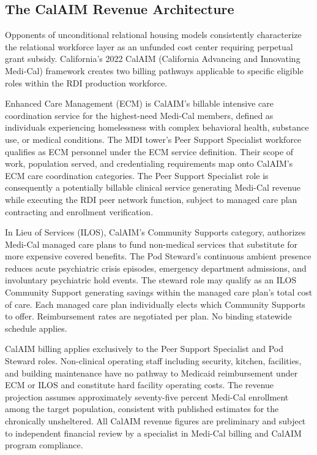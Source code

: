 \documentclass[12pt, letterpaper]{article}
\begin{document}
\subsection{The CalAIM Revenue Architecture}

Opponents of unconditional relational housing models consistently characterize the relational workforce layer as an unfunded cost center requiring perpetual grant subsidy. California's 2022 CalAIM (California Advancing and Innovating Medi-Cal) framework \citep{calaim_2022} creates two billing pathways applicable to specific eligible roles within the RDI production workforce.

Enhanced Care Management (ECM) is CalAIM's billable intensive care coordination service for the highest-need Medi-Cal members, defined as individuals experiencing homelessness with complex behavioral health, substance use, or medical conditions. The MDI tower's Peer Support Specialist workforce qualifies as ECM personnel under the ECM service definition. Their scope of work, population served, and credentialing requirements map onto CalAIM's ECM care coordination categories. The Peer Support Specialist role is consequently a potentially billable clinical service generating Medi-Cal revenue while executing the RDI peer network function, subject to managed care plan contracting and enrollment verification.

In Lieu of Services (ILOS), CalAIM's Community Supports category, authorizes Medi-Cal managed care plans to fund non-medical services that substitute for more expensive covered benefits. The Pod Steward's continuous ambient presence reduces acute psychiatric crisis episodes, emergency department admissions, and involuntary psychiatric hold events. The steward role may qualify as an ILOS Community Support generating savings within the managed care plan's total cost of care. Each managed care plan individually elects which Community Supports to offer. Reimbursement rates are negotiated per plan. No binding statewide schedule applies.

CalAIM billing applies exclusively to the Peer Support Specialist and Pod Steward roles. Non-clinical operating staff including security, kitchen, facilities, and building maintenance have no pathway to Medicaid reimbursement under ECM or ILOS and constitute hard facility operating costs. The revenue projection assumes approximately seventy-five percent Medi-Cal enrollment among the target population, consistent with published estimates for the chronically unsheltered. All CalAIM revenue figures are preliminary and subject to independent financial review by a specialist in Medi-Cal billing and CalAIM program compliance.
\end{document}
